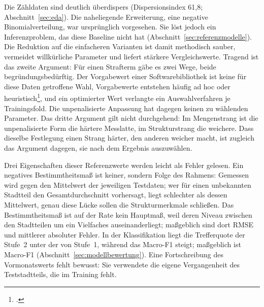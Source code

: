 \documentclass[12pt,a4paper]{article}
\begin{document}
Die Zähldaten sind deutlich überdispers (Dispersionsindex 61,8;
Abschnitt~\ref{sec:eda}). Die naheliegende Erweiterung, eine negative
Binomialverteilung, war ursprünglich vorgesehen. Sie löst jedoch ein
Inferenzproblem, das diese Baseline nicht hat
(Abschnitt~\ref{sec:referenzmodelle}). Die Reduktion auf die einfacheren
Varianten ist damit methodisch sauber, vermeidet willkürliche Parameter und
liefert stärkere Vergleichswerte. Tragend ist das zweite Argument: Für einen
Strafterm gäbe es zwei Wege, beide begründungsbedürftig. Der Vorgabewert einer
Softwarebibliothek ist keine für diese Daten getroffene Wahl, Vorgabewerte
entstehen häufig ad hoc oder heuristisch\footcite[4]{Probst2019}, und ein
optimierter Wert verlangte ein Auswahlverfahren je Trainingsfold. Die
unpenalisierte Anpassung hat dagegen keinen zu wählenden Parameter. Das dritte
Argument gilt nicht durchgehend: Im Mengenstrang ist die unpenalisierte Form
die härtere Messlatte, im Strukturstrang die weichere. Dass dieselbe Festlegung
einen Strang härter, den anderen weicher macht, ist zugleich das Argument
dagegen, sie nach dem Ergebnis auszuwählen.

Drei Eigenschaften dieser Referenzwerte werden leicht als Fehler gelesen. Ein
negatives Bestimmtheitsmaß ist keiner, sondern Folge des Rahmens: Gemessen wird
gegen den Mittelwert der jeweiligen Testdaten; wer für einen unbekannten
Stadtteil den Gesamtdurchschnitt vorhersagt, liegt schlechter als dessen
Mittelwert, genau diese Lücke sollen die Strukturmerkmale schließen. Das Bestimmtheitsmaß ist auf der Rate kein Hauptmaß, weil deren
Niveau zwischen den Stadtteilen um ein Vielfaches auseinanderliegt; maßgeblich
sind dort RMSE und mittlerer absoluter Fehler. In der Klassifikation liegt die
Trefferquote der Stufe~2 unter der von Stufe~1, während das Macro-F1 steigt;
maßgeblich ist Macro-F1 (Abschnitt~\ref{sec:modellbewertung}). Eine
Fortschreibung des Vormonatswerts fehlt bewusst: Sie verwendete die eigene
Vergangenheit des Teststadtteils, die im Training fehlt.
\end{document}
